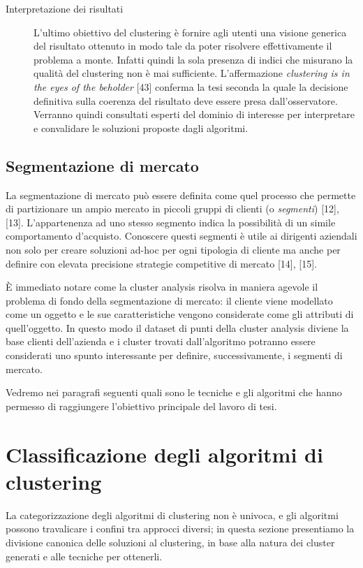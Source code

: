\begin{description}
\item[Interpretazione dei risultati] L'ultimo obiettivo del clustering \`e fornire agli utenti una visione generica del risultato ottenuto in modo tale da poter risolvere effettivamente il problema a monte. Infatti quindi la sola presenza di indici che misurano la qualit\`a del clustering non \`e mai sufficiente. L'affermazione \textit{clustering is in the eyes of the beholder} [43] conferma la tesi seconda la quale la decisione definitiva sulla coerenza del risultato deve essere presa dall'osservatore. Verranno quindi consultati esperti del dominio di interesse per interpretare e convalidare le soluzioni proposte dagli algoritmi.
\end{description}

\subsection{Segmentazione di mercato}
La segmentazione di mercato pu\`o essere definita come quel processo che permette di partizionare un ampio mercato in piccoli gruppi di clienti (o \textit{segmenti}) [12], [13]. L'appartenenza ad uno stesso segmento indica la possibilit\`a di un simile comportamento d'acquisto. Conoscere questi segmenti \`e utile ai dirigenti aziendali non solo per creare soluzioni ad-hoc per ogni tipologia di cliente ma anche per definire con elevata precisione strategie competitive di mercato [14], [15].

\`E immediato notare come la cluster analysis risolva in maniera agevole il problema di fondo della segmentazione di mercato: il cliente viene modellato come un oggetto e le sue caratteristiche vengono considerate come gli attributi di quell'oggetto. In questo modo il dataset di punti della cluster analysis diviene la base clienti dell'azienda e i cluster trovati dall'algoritmo potranno essere considerati uno spunto interessante per definire, successivamente, i segmenti di mercato.

Vedremo nei paragrafi seguenti quali sono le tecniche e gli algoritmi che hanno permesso di raggiungere l'obiettivo principale del lavoro di tesi.

\section{Classificazione degli algoritmi di clustering}
\label{sec:classificazione_algoritmi}
La categorizzazione degli algoritmi di clustering non \`e univoca, e gli algoritmi possono travalicare i confini tra approcci diversi; in questa sezione presentiamo la divisione canonica delle soluzioni al clustering, in base alla natura dei cluster generati e alle tecniche per ottenerli.
